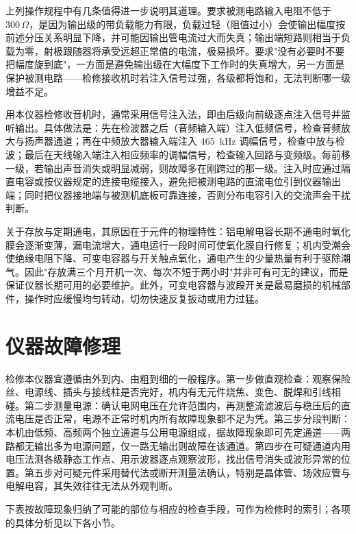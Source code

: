\documentclass[12pt,UTF8]{ctexbook}
\begin{document}
	上列操作规程中有几条值得进一步说明其道理。要求被测电路输入电阻不低于 $300\,\Omega$，是因为输出级的带负载能力有限，负载过轻（阻值过小）会使输出幅度按前述分压关系明显下降，并可能因输出管电流过大而失真；输出端短路则相当于负载为零，射极跟随器将承受远超正常值的电流，极易损坏。要求"没有必要时不要把幅度旋到底"，一方面是避免输出级在大幅度下工作时的失真增大，另一方面是保护被测电路——检修接收机时若注入信号过强，各级都将饱和，无法判断哪一级增益不足。
	
	用本仪器检修收音机时，通常采用信号注入法，即由后级向前级逐点注入信号并监听输出。具体做法是：先在检波器之后（音频输入端）注入低频信号，检查音频放大与扬声器通道；再在中频放大器输入端注入 465~kHz 调幅信号，检查中放与检波；最后在天线输入端注入相应频率的调幅信号，检查输入回路与变频级。每前移一级，若输出声音消失或明显减弱，则故障多在刚跨过的那一级。注入时应通过隔直电容或按仪器规定的连接电缆接入，避免把被测电路的直流电位引到仪器输出端；同时把仪器接地端与被测机底板可靠连接，否则分布电容引入的交流声会干扰判断。
	
	关于存放与定期通电，其原因在于元件的物理特性：铝电解电容长期不通电时氧化膜会逐渐变薄，漏电流增大，通电运行一段时间可使氧化膜自行修复；机内受潮会使绝缘电阻下降、可变电容器与开关触点氧化，通电产生的少量热量有利于驱除潮气。因此"存放满三个月开机一次、每次不短于两小时"并非可有可无的建议，而是保证仪器长期可用的必要维护。此外，可变电容器与波段开关是最易磨损的机械部件，操作时应缓慢均匀转动，切勿快速反复扳动或用力过猛。
	
	\section{仪器故障修理}
	
	检修本仪器宜遵循由外到内、由粗到细的一般程序。第一步做直观检查：观察保险丝、电源线、插头与接线柱是否完好，机内有无元件烧焦、变色、脱焊和引线相碰。第二步测量电源：确认电网电压在允许范围内，再测整流滤波后与稳压后的直流电压是否正常，电源不正常时机内所有故障现象都不足为凭。第三步分段判断：本机由低频、高频两个独立通道与公用电源组成，据故障现象即可先定通道——两路都无输出多为电源问题，仅一路无输出则故障在该通道。第四步在可疑通道内用电压法测各级静态工作点、用示波器逐点观察波形，找出信号消失或波形异常的位置。第五步对可疑元件采用替代法或断开测量法确认，特别是晶体管、场效应管与电解电容，其失效往往无法从外观判断。
	
	下表按故障现象归纳了可能的部位与相应的检查手段，可作为检修时的索引；各项的具体分析见以下各小节。
	
\end{document}
